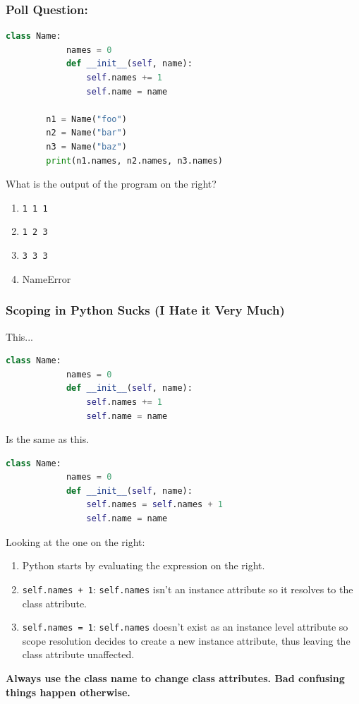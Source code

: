 \documentclass{beamer}
\begin{document}
%
%
%
\begin{frame}[fragile]
	\frametitle{Poll Question: }
	\begin{minipage}{0.49\textwidth}
		\begin{lstlisting}[language=Python, autogobble]
		class Name:
			names = 0
			def __init__(self, name):
				self.names += 1
				self.name = name

		n1 = Name("foo")
		n2 = Name("bar")
		n3 = Name("baz")
		print(n1.names, n2.names, n3.names)
		\end{lstlisting}
	\end{minipage}
	\hfill
	\begin{minipage}{0.49\textwidth}
		What is the output of the program on the right?
		\begin{enumerate}[A]
			\item \lstinline|1 1 1|
			\item \lstinline|1 2 3|
			\item \lstinline|3 3 3|
			\item NameError
		\end{enumerate}
	\end{minipage}
\end{frame}

%
%
%
\begin{frame}[fragile]
	\frametitle{Scoping in Python Sucks (I Hate it Very Much)}
	\begin{minipage}{0.47\textwidth}
		This...
		\begin{lstlisting}[language=Python, autogobble, basicstyle=\tiny]
		class Name:
			names = 0
			def __init__(self, name):
				self.names += 1
				self.name = name
		\end{lstlisting}
	\end{minipage}
	\hfill
	\begin{minipage}{0.52\textwidth}
		Is the same as this.
		\begin{lstlisting}[language=Python, autogobble, basicstyle=\tiny]
		class Name:
			names = 0
			def __init__(self, name):
				self.names = self.names + 1
				self.name = name
		\end{lstlisting}
	\end{minipage}
	\vfill
	Looking at the one on the right:
	\begin{enumerate}
		\item Python starts by evaluating the expression on the right.
		\item \lstinline|self.names + 1|:  \lstinline|self.names| isn't an instance attribute so it resolves to the class attribute.
		\item \lstinline|self.names = 1|: \lstinline|self.names| doesn't exist as an instance level attribute so scope resolution decides to create a new instance attribute, thus leaving the class attribute unaffected.
	\end{enumerate}
	\textbf{Always use the class name to change class attributes. Bad confusing things happen otherwise.}
\end{frame}
\end{document}
